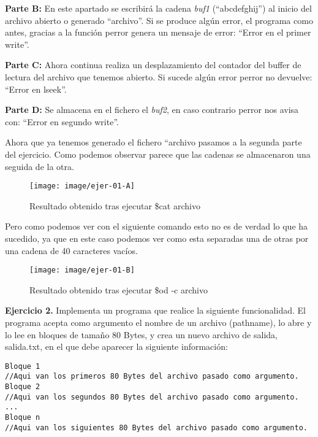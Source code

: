 \textbf{Parte B:} En este apartado se escribirá la cadena \textit{buf1} (``abcdefghij'') al inicio del archivo abierto o generado ``archivo''. Si se produce algún error, el programa como antes, gracias a la función perror genera un mensaje de error: ``Error en el primer write''.\newline

\textbf{Parte C:} Ahora continua realiza un desplazamiento del contador del buffer de lectura del archivo que tenemos abierto. Si sucede algún error perror no devuelve: ``Error en lseek''. \newline

\textbf{Parte D:} Se almacena en el fichero el \textit{buf2}, en caso contrario perror nos avisa con: ``Error en segundo write''. \newline

Ahora que ya tenemos generado el fichero ``archivo pasamos a la segunda parte del ejercicio. Como podemos observar parece que las cadenas se almacenaron una seguida de la otra. \newline

\begin{figure}[h]
	\centering
	\texttt{[image: image/ejer-01-A]}
	\caption[Ejercicio 1. A]{Resultado obtenido tras ejecutar \$cat archivo}
	\label{fig:ejer01a}
\end{figure}

Pero como podemos ver con el siguiente comando esto no es de verdad lo que ha sucedido, ya que en este caso podemos ver como esta separadas una de otras por una cadena de 40 caracteres vacíos. \newline

\begin{figure}[h]
	\centering
	\texttt{[image: image/ejer-01-B]}
	\caption[Ejercicio 1. B]{Resultado obtenido tras ejecutar \$od -c archivo}
	\label{fig:ejer01b}
\end{figure}

\newpage

{\Large \textbf{Ejercicio 2.}} Implementa un programa que realice la siguiente funcionalidad. El programa
acepta como argumento el nombre de un archivo (pathname), lo abre y lo lee en bloques de
tamaño 80 Bytes, y crea un nuevo archivo de salida, salida.txt, en el que debe aparecer la
siguiente información:

\lstset{language=, breaklines=true, basicstyle=\footnotesize}
\begin{lstlisting}[frame=single]
Bloque 1
//Aqui van los primeros 80 Bytes del archivo pasado como argumento.
Bloque 2
//Aqui van los segundos 80 Bytes del archivo pasado como argumento.
...
Bloque n
//Aqui van los siguientes 80 Bytes del archivo pasado como argumento.
\end{lstlisting}


